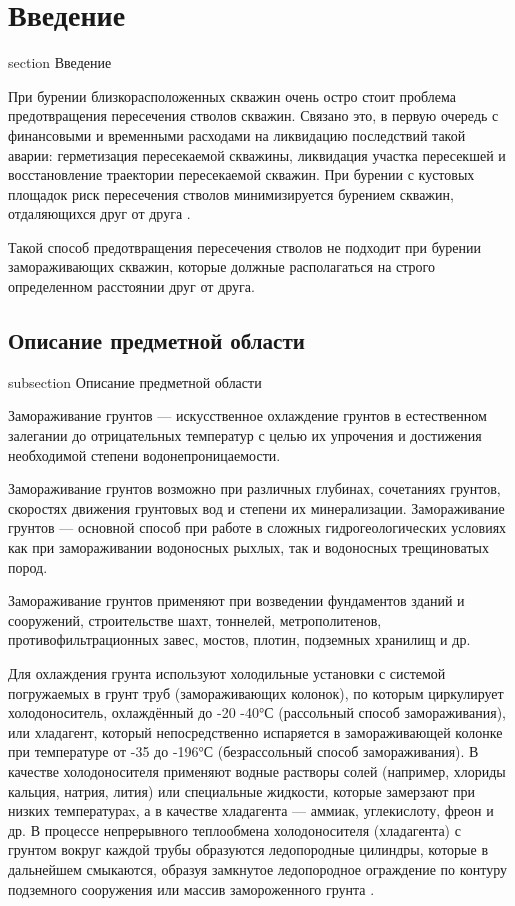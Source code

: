 \newpage
\section*{Введение}
 {section} {Введение}

При бурении близкорасположенных скважин очень остро стоит проблема предотвращения пересечения стволов скважин. Связано это, в первую очередь с финансовыми и временными
расходами на ликвидацию последствий такой аварии: герметизация пересекаемой скважины, ликвидация участка пересекшей и восстановление траектории пересекаемой скважин.
При бурении с кустовых площадок риск пересечения стволов минимизируется бурением скважин, отдаляющихся друг от друга \cite{sitedrill} \cite{wiki}.

Такой способ предотвращения пересечения стволов не подходит при бурении замораживающих скважин, которые должные располагаться на строго определенном расстоянии
друг от друга.


\subsection*{Описание предметной области}
 {subsection} {Описание предметной области}

Замораживание грунтов — искусственное охлаждение грунтов в естественном залегании до отрицательных температур с целью их упрочения и достижения необходимой степени водонепроницаемости.

Замораживание грунтов возможно при различных глубинах, сочетаниях грунтов, скоростях движения грунтовых вод и степени их минерализации. Замораживание грунтов —
основной способ при работе в сложных гидрогеологических условиях как при замораживании водоносных рыхлых, так и водоносных трещиноватых пород.

Замораживание грунтов применяют при возведении фундаментов зданий и сооружений, строительстве шахт, тоннелей, метрополитенов, противофильтрационных завес, мостов, плотин, подземных хранилищ и др.

Для охлаждения грунта используют холодильные установки с системой погружаемых в грунт труб (замораживающих колонок), по которым циркулирует холодоноситель,
охлаждённый до -20 -40°С (рассольный способ замораживания), или хладагент, который непосредственно испаряется в замораживающей колонке при температуре от -35 до -196°С
(безрассольный способ замораживания). В качестве холодоносителя применяют водные растворы солей (например, хлориды кальция, натрия, лития) или специальные жидкости,
которые замерзают при низких температураx, а в качестве хладагента — аммиак, углекислоту, фреон и др. В процессе непрерывного теплообмена холодоносителя (хладагента)
с грунтом вокруг каждой трубы образуются ледопородные цилиндры, которые в дальнейшем смыкаются, образуя замкнутое ледопородное ограждение по контуру подземного сооружения
или массив замороженного грунта \cite{metro} \cite{mountain}.

